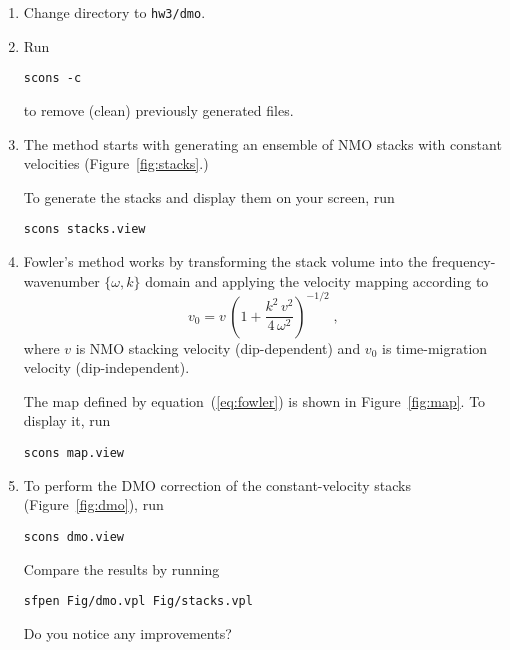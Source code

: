 \begin{enumerate}

\item Change directory to \texttt{hw3/dmo}.
\item Run
\begin{verbatim}
scons -c
\end{verbatim}
to remove (clean) previously generated files.
\item The method starts with generating an ensemble of NMO stacks with constant velocities (Figure~\ref{fig:stacks}.)


To generate the stacks and display them on your screen, run
\begin{verbatim}
scons stacks.view
\end{verbatim}

\item Fowler's method works by transforming the stack volume into the frequency-wavenumber $\{\omega,k\}$ domain and applying the velocity mapping according to
\begin{equation}
\label{eq:fowler}
v_0 = \displaystyle v\,\left(1+\frac{k^2\,v^2}{4\,\omega^2}\right)^{-1/2}\;,
\end{equation}
where $v$ is NMO stacking velocity (dip-dependent) and $v_0$ is time-migration velocity (dip-independent).

The map defined by equation~(\ref{eq:fowler}) is shown in Figure~\ref{fig:map}. 
To display it, run
\begin{verbatim}
scons map.view
\end{verbatim}


\item To perform the DMO correction of the constant-velocity stacks (Figure~\ref{fig:dmo}), run
\begin{verbatim}
scons dmo.view
\end{verbatim}
Compare the results by running
\begin{verbatim}
sfpen Fig/dmo.vpl Fig/stacks.vpl
\end{verbatim}
Do you notice any improvements?

\answer{
}



\end{enumerate}
